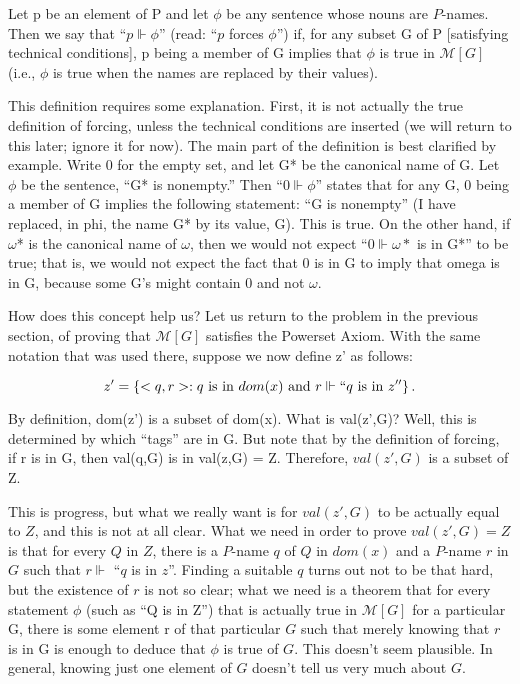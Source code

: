 \documentclass[10pt]{article}
\begin{document}
 Let p be an element of P and let $\phi$ be any sentence
 whose nouns are $P$-names. Then we say that ``$p \Vdash \phi$''
 (read: ``$p$ forces $\phi$'') if, for any subset G of P
 [satisfying technical conditions], p being a member
 of G implies that $\phi$ is true in $\mathcal{M}[G]$ (i.e., $\phi$ is
 true when the names are replaced by their values).

This definition requires some explanation. First, it is not actually the true definition of forcing, unless the technical conditions are inserted (we will return to this later; ignore it for now). The main part of the definition is best clarified by example. Write 0 for the empty set, and let G* be the canonical name of G. Let $\phi$ be the sentence, ``G* is nonempty.'' Then ``$0 \Vdash \phi$'' states that for any G, 0 being a member of G implies the following statement: ``G is nonempty'' (I have replaced, in phi, the name G* by its value, G). This is true. On the other hand, if $\omega$* is the canonical name of $\omega$, then we would not expect ``$0 \Vdash \omega*$ is in G*'' to be true; that is, we would not expect the fact that 0 is in G to imply that omega is in G, because some G's might contain 0 and not $\omega$.

How does this concept help us? Let us return to the problem in the previous section, of proving that $\mathcal{M}[G]$ satisfies the Powerset Axiom. With the same notation that was used there, suppose we now define z' as follows:

 $$z' = \left\{<q,r> : q\text{ is in }dom(x)\text{ and }r \Vdash ``q\text{ is in }z''\right\}.$$

By definition, dom(z') is a subset of dom(x). What is val(z',G)? Well, this is determined by which ``tags'' are in G. But note that by the definition of forcing, if r is in G, then val(q,G) is in val(z,G) = Z. Therefore, $val(z',G)$ is a subset of Z.

This is progress, but what we really want is for $val(z',G)$ to be actually equal to $Z$, and this is not at all clear. What we need in order to prove $val(z',G) = Z$ is that for every $Q$ in $Z$, there is a $P$-name $q$ of $Q$ in $dom(x)$ and a $P$-name $r$ in $G$ such that $r \Vdash$ ``$q$ is in $z$''. Finding a suitable $q$ turns out not to be that hard, but the existence of $r$ is not so clear; what we need is a theorem that for every statement $\phi$ (such as ``Q is in Z'') that is actually true in $\mathcal{M}[G]$ for a particular G, there is some element r of that particular $G$ such that merely knowing that $r$ is in G is enough to deduce that $\phi$ is true of $G$. This doesn't seem plausible. In general, knowing just one element of $G$ doesn't tell us very much about $G$.
\end{document}
